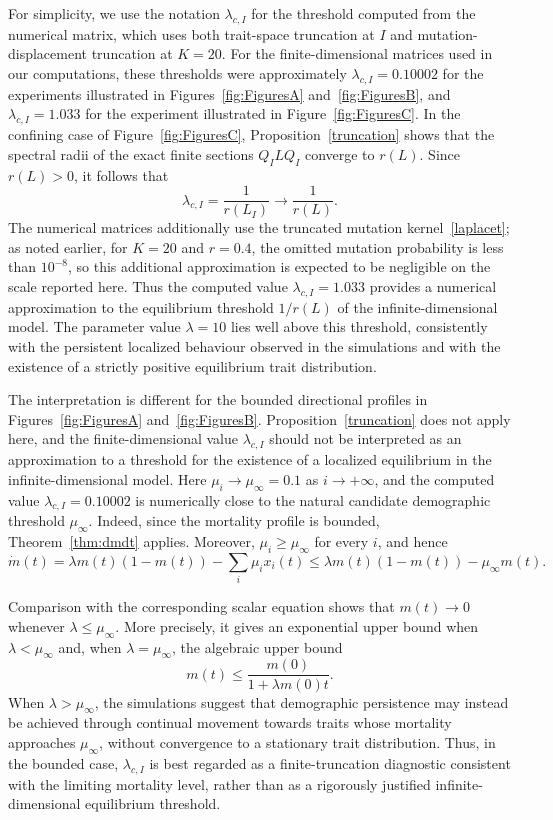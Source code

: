 \documentclass[12pt]{article}
\begin{document}
For simplicity, we use the notation $\lambda_{c,I}$ for the threshold
computed from the numerical matrix, which uses both trait-space
truncation at $I$ and mutation-displacement truncation at $K=20$. For
the finite-dimensional matrices used in our computations, these
thresholds were approximately $\lambda_{c,I}=0.10002$ for the
experiments illustrated in Figures~\ref{fig:FiguresA}
and~\ref{fig:FiguresB}, and $\lambda_{c,I}=1.033$ for the experiment
illustrated in Figure~\ref{fig:FiguresC}.
In the confining case of Figure~\ref{fig:FiguresC},
Proposition~\ref{truncation} shows that the spectral radii of the exact
finite sections $Q_I LQ_I$ converge to $r(L)$. Since $r(L)>0$, it
follows that
$$
\lambda_{c,I}=\frac{1}{r(L_I)} \to \frac{1}{r(L)}.
$$
The numerical matrices additionally use the truncated mutation
kernel~\eqref{laplacet}; as noted earlier, for $K=20$ and $r=0.4$,
the omitted mutation probability is less than $10^{-8}$, so this
additional approximation is expected to be negligible on the scale
reported here.
Thus the computed value $\lambda_{c,I}=1.033$ provides
a numerical approximation to the equilibrium threshold $1/r(L)$ of the
infinite-dimensional model. The parameter value $\lambda=10$ lies well
above this threshold, consistently with the persistent localized
behaviour observed in the simulations and with the existence of a
strictly positive equilibrium trait distribution.

The interpretation is different for the bounded directional profiles in
Figures~\ref{fig:FiguresA} and~\ref{fig:FiguresB}.
Proposition~\ref{truncation} does not apply here, and the
finite-dimensional value $\lambda_{c,I}$ should not be interpreted as
an approximation to a threshold for the existence of a localized
equilibrium in the infinite-dimensional model. Here
$\mu_i\to\mu_\infty=0.1$ as $i\to+\infty$, and the computed value
$\lambda_{c,I}=0.10002$ is numerically close to the natural candidate
demographic threshold $\mu_\infty$. Indeed, since the mortality
profile is bounded, Theorem~\ref{thm:dmdt} applies. Moreover,
$\mu_i\geq\mu_\infty$ for every $i$, and hence
$$
\dot m(t) = \lambda m(t)(1-m(t))-\sum_i\mu_i x_i(t) 
  \leq \lambda m(t)(1-m(t))-\mu_\infty m(t).
$$

Comparison with the corresponding scalar equation shows that
$m(t)\to 0$ whenever $\lambda\leq\mu_\infty$. More precisely, it gives
an exponential upper bound when $\lambda<\mu_\infty$ and, when
$\lambda=\mu_\infty$, the algebraic upper bound
$$
m(t)\leq \frac{m(0)}{1+\lambda m(0)t}.
$$
When $\lambda>\mu_\infty$, the simulations
suggest that demographic persistence may instead be achieved through
continual movement towards traits whose mortality approaches
$\mu_\infty$, without convergence to a stationary trait distribution.
Thus, in the bounded case, $\lambda_{c,I}$ is best regarded as a
finite-truncation diagnostic consistent with the limiting mortality
level, rather than as a rigorously justified infinite-dimensional
equilibrium threshold.
\end{document}
